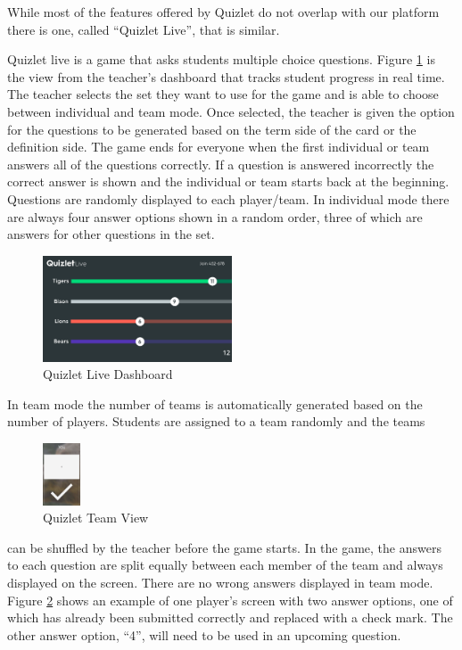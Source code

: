 \documentclass{article}
\begin{document}
        While most of the features offered by Quizlet do not overlap with our platform there is one, called ``Quizlet Live'', that is similar.
        \smallskip
        
        Quizlet live is a game that asks students multiple choice questions. Figure \ref{fig:quizlet-live} is the view from the teacher's dashboard that tracks student progress in real time. The teacher selects the set they want to use for the game and is able to choose between individual and team mode. Once selected, the teacher is given the option for the questions to be generated based on the term side of the card or the definition side. The game ends for everyone when the first individual or team answers all of the questions correctly. If a question is answered incorrectly the correct answer is shown and the individual or team starts back at the beginning. Questions are randomly displayed to each player/team. In individual mode there are always four answer options shown in a random order, three of which are answers for other questions in the set.
        
        \begin{figure}[ht]
            \centering
            \includegraphics[width=0.5\textwidth]{images/quizlet-live.png}
            \caption{Quizlet Live Dashboard \cite{quizlet}}
            \label{fig:quizlet-live}
        \end{figure}
        
        In team mode the number of teams is automatically generated based on the number of players. Students are assigned to a team randomly and the teams
        \begin{figure}
            \centering
            \includegraphics[width=0.10\textwidth]{images/quizlet-team.png}
            \caption{Quizlet Team View \cite{quizlet}}
            \label{fig:quizlet-team}
        \end{figure}
        can be shuffled by the teacher before the game starts. In the game, the answers to each question are split equally between each member of the team and always displayed on the screen. There are no wrong answers displayed in team mode.
        Figure \ref{fig:quizlet-team} shows an example of one player's screen with two answer options, one of which has already been submitted correctly and replaced with a check mark. The other answer option, ``4'', will need to be used in an upcoming question.
        \smallskip
        
\end{document}
